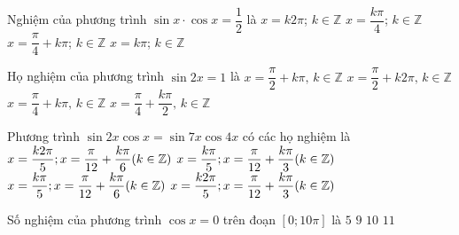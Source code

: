 \begin{ex}%
	Nghiệm của phương trình $\sin x\cdot \cos x=\dfrac{1}{2}$ là
	\choice
	{$x=k2\pi$; $k\in \mathbb{Z}$}
	{$x=\dfrac{k\pi}{4}$; $k\in \mathbb{Z}$}
	{\True $x=\dfrac{\pi}{4}+k\pi$; $k\in \mathbb{Z}$}
	{$x=k\pi$; $k\in \mathbb{Z}$}
\end{ex}
\begin{ex}%
	Họ nghiệm của phương trình $\sin2x=1$ là
	\choice
	{$x=\dfrac{\pi}{2}+k\pi,\,k\in\mathbb{Z}$}
	{$x=\dfrac{\pi}{2}+k2\pi,\,k\in\mathbb{Z}$}
	{\True $x=\dfrac{\pi}{4}+k\pi,\,k\in\mathbb{Z}$}
	{$x=\dfrac{\pi}{4}+\dfrac{k\pi}{2},\,k\in\mathbb{Z}$}
\end{ex}
\begin{ex}%
	Phương trình $\sin 2x \cos x = \sin 7x \cos 4x$ có các họ nghiệm là
	\choice
	{$x=\dfrac{k2\pi}{5};x=\dfrac{\pi}{12}+\dfrac{k\pi}{6} (k \in \Bbb{Z})$}
	{$x=\dfrac{k\pi}{5};x=\dfrac{\pi}{12}+\dfrac{k\pi}{3} (k \in \Bbb{Z})$}
	{\True $x=\dfrac{k\pi}{5};x=\dfrac{\pi}{12}+\dfrac{k\pi}{6} (k \in \Bbb{Z})$}
	{$x=\dfrac{k2\pi}{5};x=\dfrac{\pi}{12}+\dfrac{k\pi}{3} (k \in \Bbb{Z})$}
\end{ex}
\begin{ex}%
	Số nghiệm của phương trình $\cos x=0$ trên đoạn $[0 ; 10 \pi]$ là
	\choice
	{$5$}
	{$9$}
	{\True $10$}
	{$11$}
\end{ex}

